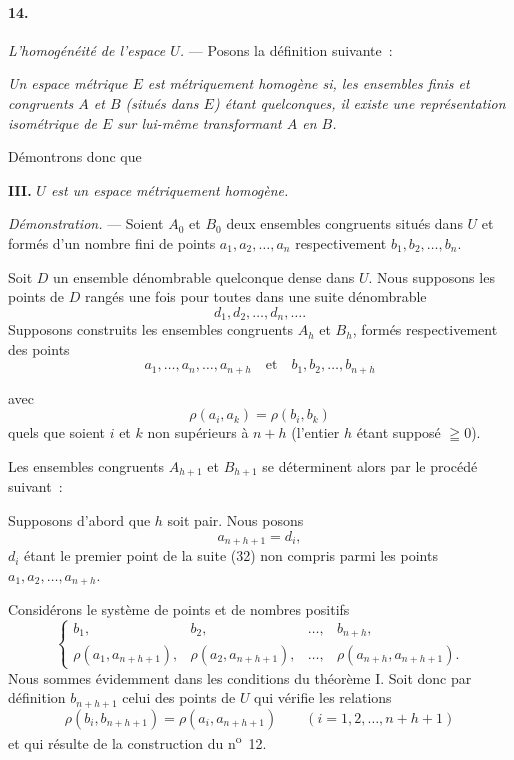 \documentclass[a4paper,12pt]{amsart}
\newcommand{\srcpage}[1]{} %
\begin{document}
\paragraph{14.}
\textit{L'homogénéité de l'espace $U$.} --- Posons la définition suivante~:

\textit{Un espace métrique $E$ est métriquement homogène si, les ensembles finis et congruents $A$ et $B$ (situés dans $E$) étant quelconques, il existe une représentation isométrique de $E$ sur lui-même transformant $A$ en $B$.}

Démontrons donc que

\textbf{III.} \textit{$U$ est un espace métriquement homogène.}

\textit{Démonstration.} --- Soient $A_0$ et $B_0$ deux ensembles congruents situés dans $U$ et formés d'un nombre fini de points $a_1,a_2,\dots,a_n$ respectivement $b_1,b_2,\dots,b_n$.

Soit $D$ un ensemble dénombrable quelconque dense dans $U$. Nous supposons les points de $D$ rangés une fois pour toutes dans une suite dénombrable
\begin{equation}\tag{33}
d_1,d_2,\dots,d_n,\dots.
\end{equation}
Supposons construits les ensembles congruents $A_h$ et $B_h$, formés respectivement des points
\[
a_1,\dots,a_n,\dots,a_{n+h}\quad\text{et}\quad b_1,b_2,\dots,b_{n+h}
\]
\srcpage{75}
avec
\[
\rho(a_i,a_k)=\rho(b_i,b_k)
\]
quels que soient $i$ et $k$ non supérieurs à $n+h$ (l'entier $h$ étant supposé $\geqq0$).

Les ensembles congruents $A_{h+1}$ et $B_{h+1}$ se déterminent alors par le procédé suivant~:

Supposons d'abord que $h$ soit pair. Nous posons
\[
a_{n+h+1}=d_i,
\]
$d_i$ étant le premier point de la suite (32) non compris parmi les points $a_1,a_2,\dots,a_{n+h}$.

Considérons le système de points et de nombres positifs
\begin{equation}\tag{33 a}
\left\{\begin{array}{cccc}
b_1,&b_2,&\dots,&b_{n+h},\\
\rho(a_1,a_{n+h+1}),&\rho(a_2,a_{n+h+1}),&\dots,&\rho(a_{n+h},a_{n+h+1}).
\end{array}\right.
\end{equation}
Nous sommes évidemment dans les conditions du théorème I. Soit donc par définition $b_{n+h+1}$ celui des points de $U$ qui vérifie les relations
\[
\rho(b_i,b_{n+h+1})=\rho(a_i,a_{n+h+1})\qquad(i=1,2,\dots,n+h+1)
\]
et qui résulte de la construction du n\textsuperscript{o}~12.
\end{document}
